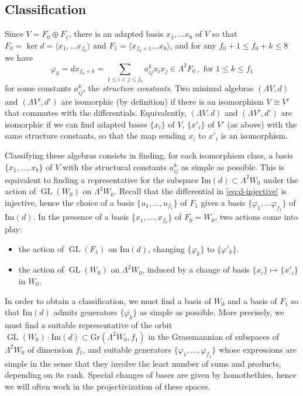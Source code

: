 \documentclass[10pt,reqno]{amsart}
\newcommand{\la}{\langle}
\newcommand{\ra}{\rangle}
\newcommand{\GL}{\operatorname{GL}}
\newcommand{\f}{\varphi}
\renewcommand{\L}{\Lambda}
\newcommand{\tr}[1]{\textrm{#1}}
\theoremstyle{definition}
\begin{document}
\subsection{Classification}

Since $V=F_0 \oplus F_1$, there is an adapted basis $x_1, \dots x_{8}$ of $V$ so that $F_0=\ker d=\la x_1, \dots x_{f_0} \ra$ and $F_1=\la x_{f_0+1} \dots x_8 \ra$, and for any $f_0+1 \le f_0+k \le 8$ we have 
\[
\f_k=d x_{f_0+k} =\sum_{1 \le i<j\le f_0} a^k_{ij} x_i x_j \in \L^2 F_0 \, , \text{ for } 1 \le k \le f_1
\]
for some constants $a^k_{ij}$, the \emph{structure constants}.
Two minimal algebras $(\L V,d)$ and $(\L V',d')$ are isomorphic (by definition) if there is an isomorphism $V \cong V'$ that commutes with the differentials. Equivalently, $(\L V,d)$ and $(\L V',d')$ are isomorphic if we can find adapted bases $\{x_i\}$ of $V$, $\{x'_i\}$ of $V'$ (as above) with the same structure constants, so that the map sending $x_i$ to $x'_i$ is an isomorphism. 

\noindent Classifying these algebras consists in finding, for each isomorphism class, a basis $\{x_1,\dots,x_8\}$ of $V$ with the structural constants $a^k_{ij}$ as simple as possible. This is equivalent to finding a representative for the subspace $\tr{Im}(d) \subset \L^2 W_0$ under the action of $\GL(W_0)$ on $\L^2 W_0$. Recall that the differential in \eqref{eq:d-injective} is injective, hence the choice of a basis $\{u_1,\ldots,u_{f_1}\}$ of $F_1$ gives a basis $\{\f_1,\ldots \f_{f_1}\}$ of $\tr{Im}(d)$. In the presence of a basis $\{x_1,\ldots,x_{f_0}\}$ of $F_0=W_0$, two actions come into play:
\begin{itemize}
    \item the action of $\GL(F_1)$ on $\tr{Im}(d)$, changing $\{\f_k\}$ to $ \{\f'_k\}$.
    \medskip
    \item the action of $\GL(W_0)$ on $\L^2 W_0$, induced by a change of basis $\{x_i\} \mapsto \{x'_i\}$ in $W_0$.
\end{itemize}
In order to obtain a classification, we must find a basis of $W_0$ and a basis of $F_1$ so that $\tr{Im}(d)$ admits generators $\{\f_k\}$ as simple as possible. More precisely, we must find a suitable representative of the orbit $\GL(W_0) \cdot \tr{Im}(d) \subset \mathrm{Gr}(\L^2 W_0, f_1)$ in the Grassmannian of subspaces of $\L^2 W_0$ of dimension $f_1$, and suitable generators $\{\f_1,\ldots,\f_{f_1}\}$ whose expressions are simple in the sense that they involve the least number of sums and products, depending on its rank. Special changes of bases are given by homothethies, hence we will often work in the projectivization of these spaces. 
\end{document}
